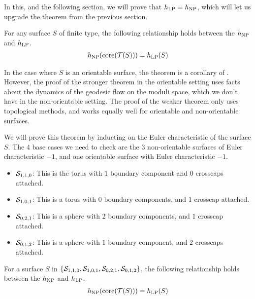 \documentclass[12pt, reqno]{amsart}
\begin{document}

In this, and the following section, we will prove that $h_{\mathrm{LP}} = h_{\mathrm{NP}}$, which will let us upgrade the {\color{red} theorem from the previous section}.
\begin{theorem}
  For any surface $S$ of finite type, the following relationship holds between the $h_{\mathrm{NP}}$ and $h_{\mathrm{LP}}$.
  \begin{align*}
    h_{\mathrm{NP}}(\mathrm{core}(\mathcal{T}(S))) = h_{\mathrm{LP}}(S)
  \end{align*}
\end{theorem}

\begin{rem}
  In the case where $S$ is an orientable surface, the theorem is a corollary of \textcite[Theorem 1.2]{10.1215/00127094-1548443}.
  However, the proof of the stronger theorem in the orientable setting uses facts about the dynamics of the geodesic flow on the moduli space, which we don't have in the non-orientable setting.
  The proof of the weaker theorem only uses topological methods, and works equally well for orientable and non-orientable surfaces.
\end{rem}

We will prove this theorem by inducting on the Euler characteristic of the surface $S$.
The $4$ base cases we need to check are the $3$ non-orientable surfaces of Euler characteristic $-1$, and one orientable surface with Euler characteristic $-1$.
\begin{itemize}
\item $\mathcal{S}_{1,1,0}$: This is the torus with $1$ boundary component and $0$ crosscaps attached.
\item $\mathcal{S}_{1,0,1}$: This is a torus with $0$ boundary components, and $1$ crosscap attached.
\item $\mathcal{S}_{0,2,1}$: This is a sphere with $2$ boundary components, and $1$ crosscap attached.
\item $\mathcal{S}_{0,1,2}$: This is a sphere with $1$ boundary component, and $2$ crosscaps attached.
\end{itemize}


\begin{lemma}
  For a surface $S$ in $\left\{ \mathcal{S}_{1,1,0}, \mathcal{S}_{1,0,1}, \mathcal{S}_{0,2,1}, \mathcal{S}_{0,1,2} \right\}$, the following relationship holds between the $h_{\mathrm{NP}}$ and $h_{\mathrm{LP}}$.
  \begin{align*}
    h_{\mathrm{NP}}(\mathrm{core}(\mathcal{T}(S))) = h_{\mathrm{LP}}(S)
  \end{align*}
\end{lemma}
\end{document}
